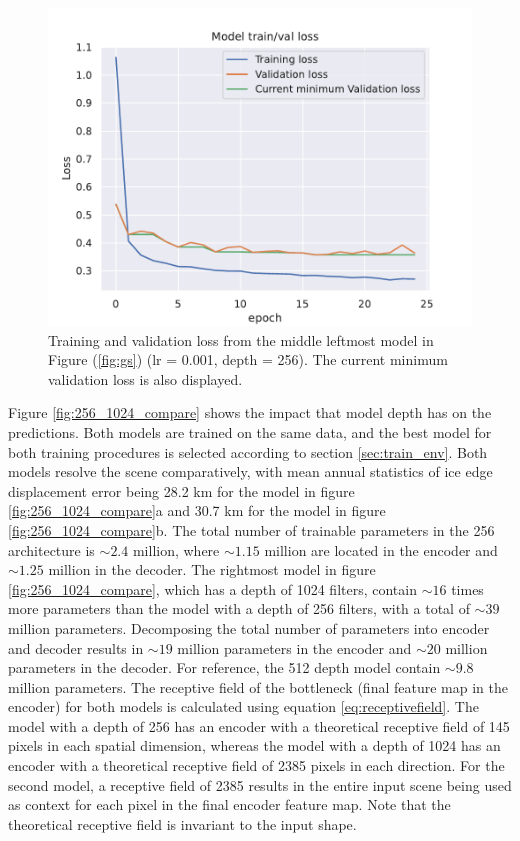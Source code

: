 \documentclass[../main/thesis]{subfiles}
\begin{document}
\begin{figure}
    \centering
    \includegraphics[width=\textwidth]{loss_curve_best_model_gs}
    \caption{\label{fig:loss_curve_from_gs}Training and validation loss from the middle leftmost model in Figure (\ref{fig:gs}) (lr = 0.001, depth = 256). The current minimum validation loss is also displayed.}
\end{figure}

Figure \ref{fig:256_1024_compare} shows the impact that model depth has on the predictions. Both models are trained on the same data, and the best model for both training procedures is selected according to section \ref{sec:train_env}. Both models resolve the scene comparatively, with mean annual statistics of ice edge displacement error being 28.2 km for the model in figure \ref{fig:256_1024_compare}a and 30.7 km for the model in figure \ref{fig:256_1024_compare}b. The total number of trainable parameters in the 256 architecture is $\sim 2.4$ million, where $\sim 1.15$ million are located in the encoder and $\sim 1.25$ million in the decoder. The rightmost model in figure \ref{fig:256_1024_compare}, which has a depth of 1024 filters, contain $\sim 16$ times more parameters than the model with a depth of 256 filters, with a total of $\sim39 $ million parameters. Decomposing the total number of parameters into encoder and decoder results in $\sim 19$ million parameters in the encoder and $\sim 20$ million parameters in the decoder. For reference, the 512 depth model contain $\sim 9.8$ million parameters. The receptive field of the bottleneck (final feature map in the encoder) for both models is calculated using equation \ref{eq:receptivefield}. The model with a depth of 256 has an encoder with a theoretical receptive field of 145 pixels in each spatial dimension, whereas the model with a depth of 1024 has an encoder with a theoretical receptive field of 2385 pixels in each direction. For the second model, a receptive field of 2385 results in the entire input scene being used as context for each pixel in the final encoder feature map. Note that the theoretical receptive field is invariant to the input shape.
\end{document}
